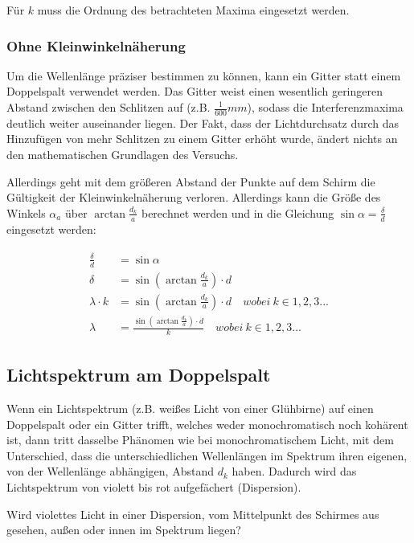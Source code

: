 Für $k$ muss die Ordnung des betrachteten Maxima eingesetzt werden.
		

\subsubsection{Ohne Kleinwinkelnäherung}

Um die Wellenlänge präziser bestimmen zu können, kann ein Gitter statt einem Doppelspalt verwendet werden. Das Gitter weist einen wesentlich geringeren Abstand zwischen den Schlitzen auf (z.B. $\frac{1}{600}mm$), sodass die Interferenzmaxima deutlich weiter auseinander liegen. Der Fakt, dass der Lichtdurchsatz durch das Hinzufügen von mehr Schlitzen zu einem Gitter erhöht wurde, ändert nichts an den mathematischen Grundlagen des Versuchs.
	
Allerdings geht mit dem größeren Abstand der Punkte auf dem Schirm die Gültigkeit der Kleinwinkelnäherung verloren. Allerdings kann die Größe des Winkels $\alpha_a$ über $\arctan{\frac{d_k}{a}}$ berechnet werden und in die Gleichung $\sin{\alpha} = \frac{\delta}{d}$ eingesetzt werden:
	
\begin{align}
\begin{split}
		\frac{\delta}{d} &= \sin{\alpha} \\
		 \delta &= \sin{(\arctan{\frac{d_k}{a}})} \cdot d \\
		\lambda \cdot k &= \sin{(\arctan{\frac{d_k}{a}})} \cdot d \quad wobei \ k \in 1,2,3... \\
		\lambda &= \frac{\sin{(\arctan{\frac{d_k}{a}})} \cdot d}{k} \quad wobei \ k \in 1,2,3...
\end{split}
\end{align}


\subsection{Lichtspektrum am Doppelspalt}

Wenn ein Lichtspektrum (z.B. weißes Licht von einer Glühbirne) auf einen Doppelspalt oder ein Gitter trifft, welches weder monochromatisch noch kohärent ist, dann tritt dasselbe Phänomen wie bei monochromatischem Licht, mit dem Unterschied, dass die unterschiedlichen Wellenlängen im Spektrum ihren eigenen, von der Wellenlänge abhängigen, Abstand $d_k$ haben. Dadurch wird das Lichtspektrum von violett bis rot aufgefächert (Dispersion).

\begin{Aufgabe}
Wird violettes Licht in einer Dispersion, vom Mittelpunkt des Schirmes aus gesehen, außen oder innen im Spektrum liegen?
\end{Aufgabe}


